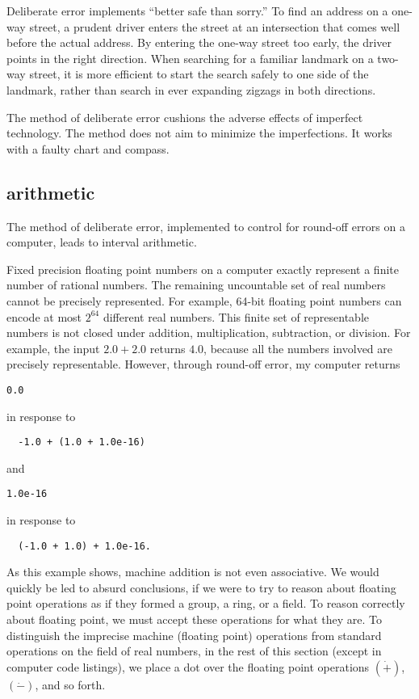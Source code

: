 Deliberate error implements ``better safe than sorry.''
To find an address on a one-way street,  a prudent driver enters the
street at an intersection that comes well before the actual address.  
By entering the one-way street too early,
the driver points in the right direction.  When searching for a familiar landmark
on a two-way street, it is more efficient  
to start the search safely to one side of the landmark, 
rather than search in ever
expanding zigzags in both directions. 


The method of deliberate error cushions the adverse effects of imperfect technology.
The method does not aim to minimize the imperfections.  It works with a faulty
chart and compass.

\subsection{arithmetic}

The method of deliberate error, implemented to control for round-off errors on a computer,
leads to interval arithmetic.  

Fixed precision 
floating point numbers on a computer exactly represent a finite
number of rational numbers.  The remaining uncountable set of real numbers cannot
be precisely represented.  For example, 64-bit floating point numbers can encode at most
$2^{64}$ different real numbers.    This finite set of representable numbers is not
closed under addition, multiplication, subtraction, or division.  For example,
the input $2.0 + 2.0$ returns $4.0$, because all the numbers involved
are precisely representable.  However, through round-off error, my computer returns 
\begin{verbatim}0.0
\end{verbatim} 
in response to
\begin{verbatim}
  -1.0 + (1.0 + 1.0e-16)
\end{verbatim}
and 
\begin{verbatim}1.0e-16
\end{verbatim} 
in response to 
\begin{verbatim}
  (-1.0 + 1.0) + 1.0e-16.
\end{verbatim}
As this example shows, machine addition is not even associative.  We would quickly be led to absurd
conclusions, if we were to try to reason about floating point operations as if
they formed a group, a ring, or a field.  To reason correctly about floating point, we
must accept these operations for what they are.  To distinguish the imprecise
machine (floating point) operations from standard operations on the field of real numbers, in the rest of this section (except in computer code listings), 
we place a dot over the floating point operations $(\dot +)$, $(\dot -)$, and so forth.

